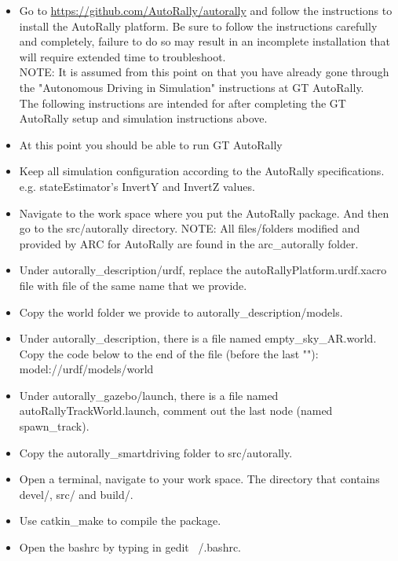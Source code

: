 \documentclass[compsoc,draftclsnofoot,onecolumn,10pt]{IEEEtran}
\begin{document}
    \begin{itemize}
    	\item Go to \href{https://github.com/AutoRally/autorally}{https://github.com/AutoRally/autorally} and follow the instructions to install the AutoRally platform. Be sure to follow the instructions carefully and completely, failure to do so may result in an incomplete installation that will require extended time to troubleshoot.\\
    	NOTE: It is assumed from this point on that you have already gone
through the "Autonomous Driving in Simulation" instructions at GT AutoRally.\\
    	The following instructions are intended for after completing the GT AutoRally setup and simulation instructions above.
    	\item At this point you should be able to run GT AutoRally
    	\item Keep all simulation configuration according to the AutoRally specifications.\\ e.g. stateEstimator's InvertY and InvertZ values.
    	\item Navigate to the work space where you put the AutoRally package. And then go to the src/autorally directory.
    	NOTE: All files/folders modified and provided by ARC for AutoRally are found in the arc\_autorally folder.\\
    	\item Under autorally\_description/urdf, replace the autoRallyPlatform.urdf.xacro file with file of the same name that we provide.
    	\item Copy the world folder we provide to autorally\_description/models.
    	\item Under autorally\_description, there is a file named empty\_sky\_AR.world. Copy the code below to the end of the file (before the last ""):\\ model://urdf/models/world
    	\item Under autorally\_gazebo/launch, there is a file named autoRallyTrackWorld.launch, comment out the last node (named spawn\_track).
    	\item Copy the autorally\_smartdriving folder to src/autorally.
    	\item Open a terminal, navigate to your work space. The directory that contains devel/, src/ and build/.
    	\item Use catkin\_make to compile the package.
    	\item Open the bashrc by typing in gedit ~/.bashrc.

\end{itemize}
\end{document}
